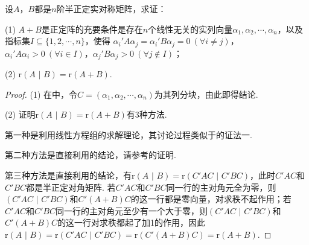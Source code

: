 \documentclass[../../main.tex]{subfiles}%
\begin{document}
\begin{proposition}\label{proposition:两个半正定阵可同时合同对角化3}
设\(A\)，\(B\)都是\(n\)阶半正定实对称矩阵，求证：

(1) \(A + B\)是正定阵的充要条件是存在\(n\)个线性无关的实列向量\(\alpha_1,\alpha_2,\cdots,\alpha_n\)，以及指标集\(I\subseteq\{1,2,\cdots,n\}\)，使得
\(\alpha_i'A\alpha_j=\alpha_i'B\alpha_j = 0\ (\forall i\neq j)\)，\(\alpha_i'A\alpha_i>0\ (\forall i\in I)\)，\(\alpha_j'B\alpha_j>0\ (\forall j\notin I)\)；

(2) \(\mathrm{r}(A\,\,|\,\, B)=\mathrm{r}(A + B)\).
\end{proposition}
\begin{proof}

(1) 在中，令\(C = (\alpha_1,\alpha_2,\cdots,\alpha_n)\)为其列分块，由此即得结论.

(2) 证明\(\mathrm{r}(A\,\,|\,\, B)=\mathrm{r}(A + B)\)有3种方法. 

第一种是利用线性方程组的求解理论，其讨论过程类似于的证法一. 

第二种方法是直接利用的结论，请参考的证明. 

第三种方法是直接利用的结论，有\(\mathrm{r}(A\,\,|\,\, B)=\mathrm{r}(C'AC\,\,|\,\, C'BC)\)，此时\(C'AC\)和\(C'BC\)都是半正定对角矩阵. 若\(C'AC\)和\(C'BC\)同一行的主对角元全为零，则\((C'AC\,\,|\,\, C'BC)\)和\(C'(A + B)C\)的这一行都是零向量，对求秩不起作用；若\(C'AC\)和\(C'BC\)同一行的主对角元至少有一个大于零，则\((C'AC\,\,|\,\, C'BC)\)和\(C'(A + B)C\)的这一行对求秩都起了加1的作用，因此\(\mathrm{r}(A\,\,|\,\, B)=\mathrm{r}(C'AC\,\,|\,\, C'BC)=\mathrm{r}(C'(A + B)C)=\mathrm{r}(A + B)\).

\end{proof}
\end{document}
